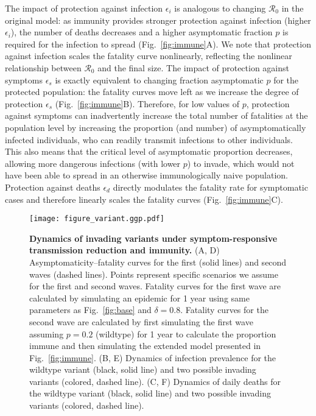 \documentclass[12pt]{article}
\newcommand{\fref}[1]{Fig.~\ref{fig:#1}}
\newcommand{\RR}{\ensuremath{{\mathcal R}}\xspace}
\begin{document}
The impact of protection against infection $\epsilon_i$ is analogous to changing $\RR_0$ in the original model: as immunity provides stronger protection against infection (higher $\epsilon_i$), the number of deaths decreases and a higher asymptomatic fraction $p$ is required for the infection to spread (\fref{immune}A).
We note that protection against infection scales the fatality curve nonlinearly, reflecting the nonlinear relationship between $\RR_0$ and the final size.
The impact of protection against symptoms $\epsilon_s$ is exactly equivalent to changing fraction asymptomatic $p$ for the protected population:
the fatality curves move left as we increase the degree of protection $\epsilon_s$ (\fref{immune}B).
Therefore, for low values of $p$, protection against symptoms can inadvertently increase the total number of fatalities at the population level by increasing the proportion (and number) of asymptomatically infected individuals, who can readily transmit infections to other individuals.
This also means that the critical level of asymptomatic proportion decreases, allowing more dangerous infections (with lower $p$) to invade, which would not have been able to spread in an otherwise immunologically naive population.
Protection against deaths $\epsilon_d$ directly modulates the fatality rate for symptomatic cases and therefore linearly scales the fatality curves (\fref{immune}C).

\begin{figure}[!ht]
\texttt{[image: figure\_variant.ggp.pdf]}
\caption{
\textbf{Dynamics of invading variants under symptom-responsive transmission reduction and immunity.}
(A, D) Asymptomaticity--fatality curves for the first (solid lines) and second waves (dashed lines).
Points represent specific scenarios we assume for the first and second waves.
Fatality curves for the first wave are calculated by simulating an epidemic for 1 year using same parameters as \fref{base} and $\delta=0.8$.
Fatality curves for the second wave are calculated by first simulating the first wave assuming $p=0.2$ (wildtype) for 1 year to calculate the proportion immune and then simulating the extended model presented in \fref{immune}.
(B, E) Dynamics of infection prevalence for the wildtype variant (black, solid line) and two possible invading variants (colored, dashed line).
(C, F) Dynamics of daily deaths for the wildtype variant (black, solid line) and two possible invading variants (colored, dashed line).
}
\label{fig:variant}
\end{figure}
\end{document}
